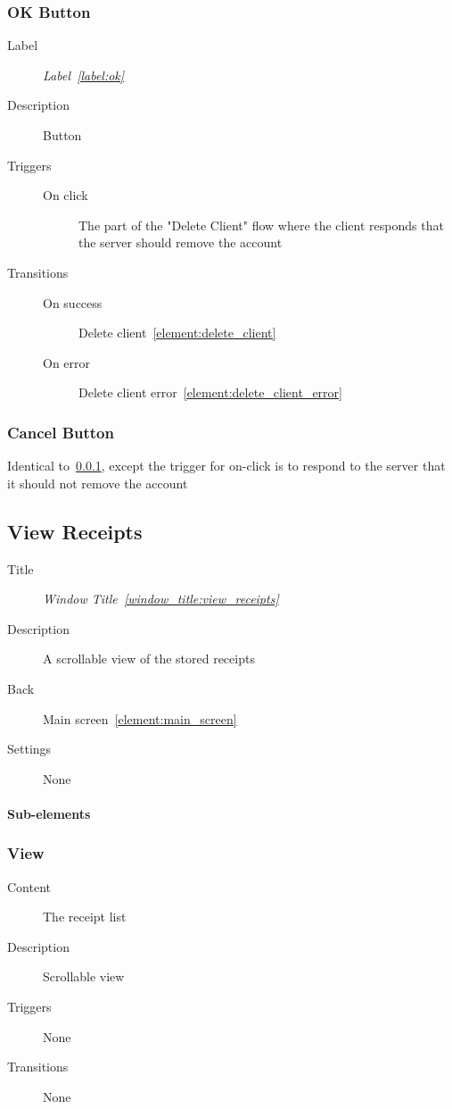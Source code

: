 \documentclass[a4paper,10pt]{article}
\newcommand{\windowTitleLabelText}{Window Title}
\newcommand{\windowTitleLabel}{window_title:}
\DeclareRobustCommand{\windowTitleRef}[1]{%
   \emph{\windowTitleLabelText~\ref{\windowTitleLabel#1}}}
\newcommand{\labelLabelText}{Label}
\newcommand{\labelLabel}{label:}
\DeclareRobustCommand{\labelRef}[1]{%
   \emph{\labelLabelText~\ref{\labelLabel#1}}}
\newcommand{\elementLabel}{element:}
\DeclareRobustCommand{\element}[2]{\subsection{#1}\label{\elementLabel#2}}
\DeclareRobustCommand{\elementRef}[1]{\ref{\elementLabel#1}}
\begin{document}
\subsubsection{OK Button}
\label{delete_account_confirmation:ok}
\begin{description}
 \item[Label] \labelRef{ok}
 \item[Description] Button
 \item[Triggers]\mbox{}
 \begin{description}
  \item[On click] The part of the "Delete Client" flow where the client 
responds that the server should remove the account
 \end{description}
 \item[Transitions]\mbox{}
 \begin{description}
  \item[On success] Delete client~\elementRef{delete_client}
  \item[On error] Delete client error~\elementRef{delete_client_error}
 \end{description}
\end{description}

\subsubsection{Cancel Button}
Identical to~\ref{delete_account_confirmation:ok}, except the trigger for 
on-click is to respond to the server that it should not remove the account

\element{View Receipts}{view_receipts}

\begin{description}
 \item[Title] \windowTitleRef{view_receipts}
 \item[Description] A scrollable view of the stored receipts
 \item[Back] Main screen~\elementRef{main_screen}
 \item[Settings] None
\end{description}

\paragraph{Sub-elements}

\subsubsection{View}
\begin{description}
 \item[Content] The receipt list
 \item[Description] Scrollable view
 \item[Triggers] None
 \item[Transitions] None
\end{description}
\end{document}
